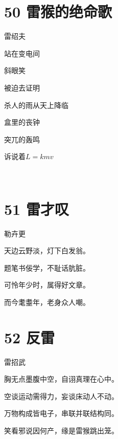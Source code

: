 \documentclass[UTF8,12pt,oneside]{ctexbook}
\begin{document}
        \newpage
        
        \section{50 雷猴的绝命歌}
        \begin{center}
            雷绍夫
        \end{center}
        
        \begin{center}
            站在变电间
            
            斜眼笑
            
            被迫去证明
            
            杀人的雨从天上降临
            
            盒里的丧钟
            
            突兀的轰鸣
            
            诉说着$L=kmv$
            
            ~\\
        \end{center}
        
        \section{51 雷才叹}
        \begin{center}
            勒卉更
        \end{center}
        
        \begin{center}
            天边云野淡，灯下白发翁。
            
            题笔书佞学，不耻话肮脏。
            
            可怜年少时，属得好文章。
            
            而今耄耋年，老身众人嘲。
        \end{center}
        
        \newpage
        
        \section{52 反雷}
        \begin{center}
            雷招武
        \end{center}
        
        \begin{center}
            胸无点墨腹中空，自诩真理在心中。
        
            空谈运动需得力，妄谈床动人不动。
        
            万物构成皆电子，串联并联结构同。
        
            笑看邪说因何产，缘是雷猴跳出笼。
        \end{center}
        
\end{document}
